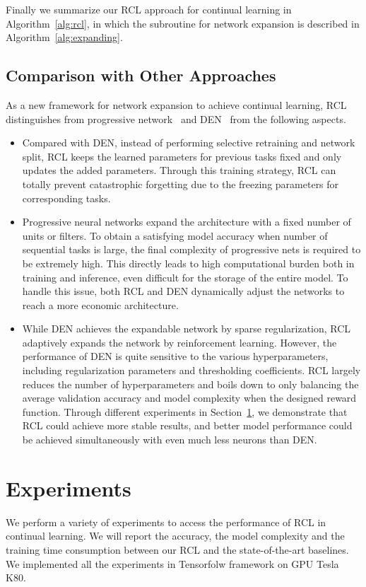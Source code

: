 \documentclass{article}
\begin{document}
Finally we summarize our RCL approach for continual learning in Algorithm~\ref{alg:rcl}, in which the subroutine for network expansion is described in Algorithm~\ref{alg:expanding}.

\subsection{Comparison with Other Approaches}


As a new framework for network expansion to achieve continual learning, RCL distinguishes from progressive network~\cite{rusu1} and DEN~\cite{yoon1} from the following aspects.
\begin{itemize}
\item Compared with DEN, instead of performing selective retraining and network split,  RCL keeps the learned parameters for previous tasks fixed and only updates the added parameters. Through this training strategy, RCL can totally prevent catastrophic forgetting due to the freezing parameters for corresponding tasks.
\item Progressive neural networks expand the architecture with a fixed number of units or filters. To obtain a satisfying model accuracy when number of sequential tasks is large, the final complexity of progressive nets is required to be extremely high. This directly leads to high computational burden both in training and inference, even difficult for the storage of the entire model. To handle this issue, both RCL and DEN dynamically adjust the networks to reach a more economic architecture.
\item While DEN achieves the expandable network by sparse regularization, RCL adaptively expands the network by reinforcement learning.
However, the performance of DEN is quite sensitive to the various hyperparameters, including regularization parameters and thresholding coefficients. RCL largely reduces the number of hyperparameters and boils down to only balancing the average validation accuracy and model complexity when the designed reward function.  Through different experiments in Section~\ref{sec:exp}, we demonstrate that RCL could achieve more stable results, and better model performance could be achieved simultaneously with even much less neurons than DEN.
\end{itemize}



\section{Experiments}
\label{sec:exp}
We perform a variety of experiments to access the performance of RCL in continual learning. We will report the accuracy, the model complexity and the training time consumption between our RCL and the state-of-the-art baselines. We implemented all the experiments in Tensorfolw framework on GPU Tesla K80.
\end{document}
